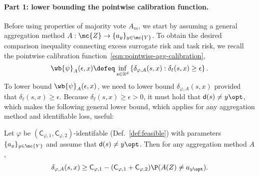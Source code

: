 \documentclass[11pt]{article}
\newcommand{\constant}{\mathsf{C}}  %
\newcommand{\pred}{\mathsf{d}}  %
\newcommand{\tloss}{\ell}  %
\newcommand{\sloss}{\varphi}  %
\newcommand{\extloss}{\delta_\tloss}
\newcommand{\exslossagg}{\delta_{\sloss,A}}
\begin{document}
\paragraph{Part 1: lower bounding the pointwise calibration function.}
Before using properties of majority vote $A_m$, we start by assuming a
general aggregation method $A : \mc{Z} \to \{a_y\}_{y \in \mc{Y}}$.
%
To obtain the desired comparison inequality connecting
excess surrogate risk and task risk, we recall the pointwise calibration
function~\eqref{eqn:pointwise-agg-calibration},
\begin{align*}
  \wb{\psi}_A(\epsilon, x)
  \defeq \inf_{s \in \mathbb{R}^d}
  \left\{\exslossagg(s, x) : \extloss(s, x) \geq \epsilon\right\}.
\end{align*}
To lower bound $\wb{\psi}_A(\epsilon, x)$, we need to lower bound
$\delta_{\sloss, A}(s,x)$ provided that $\extloss(s,x) \geq
\epsilon$.
%
Because $\extloss (s,x) \geq \epsilon > 0$, it must hold that $\pred(s) \neq
y\opt$, which makes the following general lower bound, which applies for any
aggregation method and identifiable loss, useful:
\begin{lemma}
  \label{lemma:calib-lower-bound-1}
  Let $\sloss$ be $(\constant_{\sloss,1}, \constant_{\sloss,2})$-identifable
  (Def.~\ref{def:feasible}) with parameters
  $\{a_y\}_{y \in \mc{Y}}$
  and assume that $\pred(s) \neq y\opt$.
  Then for any aggregation method $A$,
  \begin{equation}
    \label{eq:calib-lower-bound-1}
    \delta_{\varphi, {A}} (s, x)
    \ge \constant_{\sloss,1} - (\constant_{\sloss,1} + \constant_{\sloss, 2})
    \P(A(Z) \neq a_{y\opt}).
  \end{equation}
\end{lemma}
\end{document}
